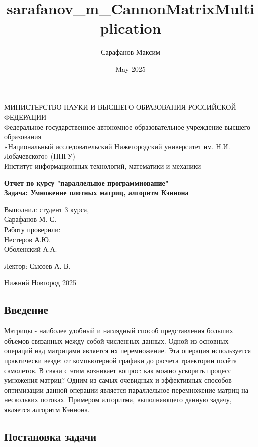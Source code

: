 \documentclass[12pt]{article}
\title{sarafanov_m_CannonMatrixMultiplication}
\author{Сарафанов Максим }
\date{May 2025}
\begin{document}
\begin{titlepage}
\begin{center}
МИНИСТЕРСТВО НАУКИ И ВЫСШЕГО ОБРАЗОВАНИЯ РОССИЙСКОЙ ФЕДЕРАЦИИ \\
    Федеральное государственное автономное образовательное учреждение высшего образования \\
    «Национальный исследовательский Нижегородский университет им. Н.И. Лобачевского» (ННГУ) \\
    Институт информационных технологий, математики и механики
\end{center}
\vspace{3cm}
\begin{center}
    \textbf{Отчет по курсу "параллельное программиование" \\
            Задача: Умножение плотных матриц, алгоритм Кэннона}
\end{center}
\vspace{4cm}

\begin{flushright}
Выполнил: студент 3 курса, \\ Сарафанов М. С. \\
\vspace{0.5cm}
Работу проверили:\\
 Нестеров А.Ю. \\ 
 Оболенский А.А.

\vspace{0.5cm}
 Лектор: Сысоев А. В. \\
\end{flushright}
\vspace{2cm}
\begin{center}
    Нижний Новгород 2025\newpage
\end{center}
\end{titlepage}
\begin{center}
    \section{Введение}
\end{center}

Матрицы - наиболее удобный и наглядный способ представления больших объемов связанных между собой численных данных. Одной из основных операций над матрицами является их перемножение. Эта операция используется практически везде: от компьютерной графики до расчета траектории полёта самолетов. В связи с этим возникает вопрос: как можно ускорить процесс умножения матриц? Одним из самых очевидных и эффективных способов оптимизации данной операции является параллельное перемножение матриц на нескольких потоках. Примером алгоритма, выполняющего данную задачу, является алгоритм Кэннона.
\newpage
\begin{center}
    \section{Постановка задачи}
\end{center}
\end{document}
